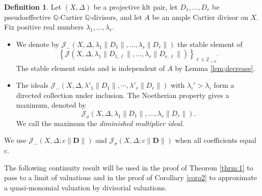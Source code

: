 \documentclass[a4paper,12pt]{amsart}
\theoremstyle{plain}
\theoremstyle{definition}
\newtheorem{definition}[theorem]{Definition}
\numberwithin{equation}{section}
\newcommand{\Z}{\mathbb{Z}}
\newcommand{\Q}{\mathbb{Q}}
\begin{document}
\begin{definition}
Let $(X,\Delta)$ be a projective klt pair, let $D_1,\dots,D_r$ be pseudoeffective $\Q$-Cartier $\Q$-divisors, and let $A$ be an ample Cartier divisor on $X$. Fix positive real numbers $\lambda_1,\dots,\lambda_r$.
\begin{itemize}
\item[(1)] We denote by $\mathcal{J}_-(X,\Delta,\lambda_1\|D_1\|,\dots,\lambda_r\|D_r\|)$ the stable element of
$$ \left\{\mathcal{J}\left(X,\Delta,\lambda_1\|D_{1,\ell}\|,\dots,\lambda_r\|D_{r,\ell}\|\right)\right\}_{\ell\in \Z_{>0}}.$$
The stable element exists and is independent of $A$ by Lemma \ref{lem;decrease}.
\item[(2)] The ideals $\mathcal{J}_-(X,\Delta,\lambda'_1\|D_1\|,\cdots,\lambda'_r\|D_r\|)$ with $\lambda_i'>\lambda_i$ form a directed collection under inclusion. The Noetherian property gives a maximum, denoted by 
\[
\mathcal{J}_{\sigma}(X,\Delta,\lambda_1\|D_1\|,\dots,\lambda_r\|D_r\|).
\]
We call the maximum the \emph{diminished multiplier ideal}. 
\end{itemize}
We use $\mathcal{J}_{-}(X,\Delta;c\|\mathbf{D}\|)$ and $\mathcal{J}_{\sigma}(X,\Delta;c\|\mathbf{D}\|)$ when all coefficients equal $c$.
\end{definition}

The following continuity result will be used in the proof of Theorem \ref{thrm:1} to pass to a limit of valuations and in the proof of Corollary \ref{coro2} to approximate a quasi-monomial valuation by divisorial valuations.
\end{document}
